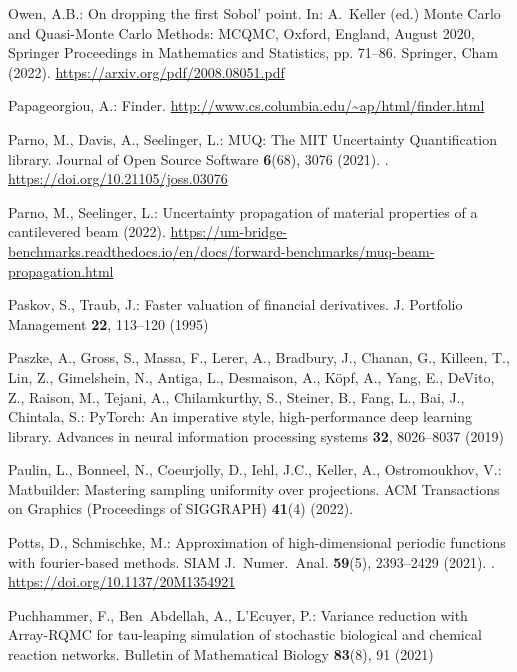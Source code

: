 \documentclass[graybox]{svmult}
\begin{document}
\begin{thebibliography}{10}
	Owen, A.B.: On dropping the first {Sobol'} point.
	\newblock In: A.~Keller (ed.) {M}onte {C}arlo and Quasi-{M}onte {C}arlo
	Methods: {MCQMC}, {O}xford, England, {A}ugust 2020, Springer Proceedings in
	Mathematics and Statistics, pp. 71--86. Springer, Cham (2022).
	\newblock \urlprefix\url{https://arxiv.org/pdf/2008.08051.pdf}

	Papageorgiou, A.: Finder.
	\newblock \urlprefix\url{http://www.cs.columbia.edu/~ap/html/finder.html}

	Parno, M., Davis, A., Seelinger, L.: {MUQ}: The {MIT} {U}ncertainty
	{Q}uantification library.
	\newblock Journal of Open Source Software \textbf{6}(68), 3076 (2021).
	\newblock {}.
	\newblock \urlprefix\url{https://doi.org/10.21105/joss.03076}

	Parno, M., Seelinger, L.: Uncertainty propagation of material properties of a
	cantilevered beam (2022).
	\newblock
	\urlprefix\url{https://um-bridge-benchmarks.readthedocs.io/en/docs/forward-benchmarks/muq-beam-propagation.html}

	Paskov, S., Traub, J.: Faster valuation of financial derivatives.
	\newblock J. Portfolio Management \textbf{22}, 113--120 (1995)

	Paszke, A., Gross, S., Massa, F., Lerer, A., Bradbury, J., Chanan, G., Killeen,
	T., Lin, Z., Gimelshein, N., Antiga, L., Desmaison, A., K{\"o}pf, A., Yang,
	E., DeVito, Z., Raison, M., Tejani, A., Chilamkurthy, S., Steiner, B., Fang,
	L., Bai, J., Chintala, S.: Py{T}orch: An imperative style, high-performance
	deep learning library.
	\newblock Advances in neural information processing systems \textbf{32},
	8026--8037 (2019)

	Paulin, L., Bonneel, N., Coeurjolly, D., Iehl, J.C., Keller, A., Ostromoukhov,
	V.: Matbuilder: Mastering sampling uniformity over projections.
	\newblock ACM Transactions on Graphics (Proceedings of SIGGRAPH) \textbf{41}(4)
	(2022).
	\newblock {}

	Potts, D., Schmischke, M.: Approximation of high-dimensional periodic functions
	with fourier-based methods.
	\newblock SIAM J.\ Numer.\ Anal. \textbf{59}(5), 2393--2429 (2021).
	\newblock {}.
	\newblock \urlprefix\url{https://doi.org/10.1137/20M1354921}

	Puchhammer, F., Ben~Abdellah, A., L'Ecuyer, P.: Variance reduction with
	{Array-RQMC} for tau-leaping simulation of stochastic biological and chemical
	reaction networks.
	\newblock Bulletin of Mathematical Biology \textbf{83}(8), 91 (2021)


\end{thebibliography}
\end{document}
